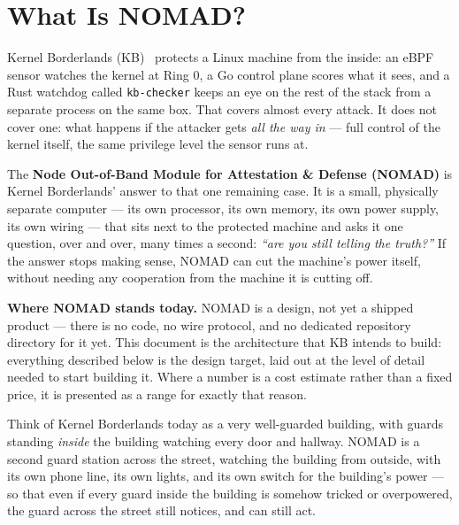 \documentclass[11pt,a4paper]{article}
\begin{document}
\tableofcontents
\thispagestyle{plain}
\clearpage

\section{What Is NOMAD?}
\label{sec:what-is-nomad}

Kernel Borderlands (KB)~\cite{repo} protects a Linux machine from the inside: an
eBPF sensor watches the kernel at Ring 0, a Go control plane scores what
it sees, and a Rust watchdog called \texttt{kb-checker} keeps an eye on
the rest of the stack from a separate process on the same box. That
covers almost every attack. It does not cover one: what happens if the
attacker gets \emph{all the way in} --- full control of the kernel
itself, the same privilege level the sensor runs at.

The \textbf{Node Out-of-Band Module for Attestation \& Defense (NOMAD)} is Kernel Borderlands'
answer to that one remaining case. It is a small, physically separate
computer --- its own processor, its own memory, its own power supply,
its own wiring --- that sits next to the protected machine and asks it
one question, over and over, many times a second: \emph{``are you still
telling the truth?''} If the answer stops making sense, NOMAD can cut the
machine's power itself, without needing any cooperation from the
machine it is cutting off.

\begin{statusbox}
\textbf{Where NOMAD stands today.} NOMAD is a design, not yet a shipped
product --- there is no code, no wire protocol, and no dedicated
repository directory for it yet. This document is the architecture that
KB intends to build: everything described below is the design target,
laid out at the level of detail needed to start building it. Where a
number is a cost estimate rather than a fixed price, it is presented as
a range for exactly that reason.
\end{statusbox}

\begin{plainbox}
Think of Kernel Borderlands today as a very well-guarded building, with
guards standing \emph{inside} the building watching every door and
hallway. NOMAD is a second guard station across the street, watching the
building from outside, with its own phone line, its own lights, and its
own switch for the building's power --- so that even if every guard
inside the building is somehow tricked or overpowered, the guard across
the street still notices, and can still act.
\end{plainbox}
\end{document}
